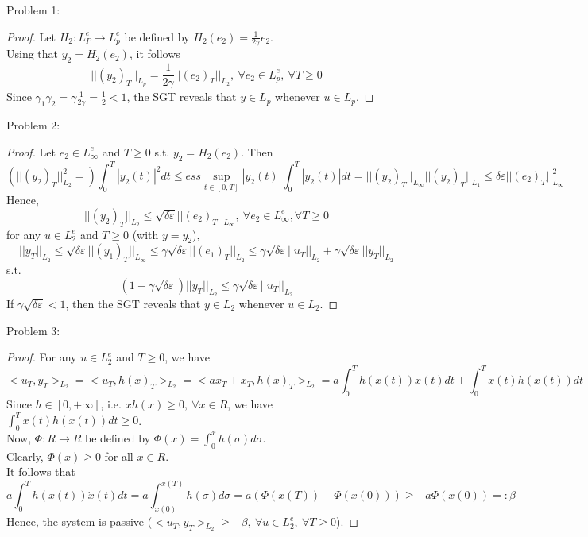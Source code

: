 Problem 1:
\begin{proof}
    Let $H_2:L^e_P \rightarrow L^e_p$ be defined by $H_2(e_2)=\frac{1}{2\gamma}e_2$. \\
    Using that $y_2=H_2(e_2)$, it follows
    $$||(y_2)_T||_{L_p}=\frac{1}{2\gamma}||(e_2)_T||_{L_2}, \ \forall e_2 \in L^e_p, \ \forall T \ge 0$$
    Since $\gamma_1 \gamma_2 = \gamma \frac{1}{2\gamma} = \frac{1}{2} < 1$, the SGT reveals that $y \in L_p$ whenever $u \in L_p$.
\end{proof}

Problem 2:
\begin{proof}
    Let $e_2 \in L^e_{\infty}$ and $T \ge 0$ s.t. $y_2=H_2(e_2)$. Then
    $$(||(y_2)_T||^2_{L_2}=) \int^T_0|y_2(t)|^2dt \le ess \sup_{t \in [0,T]} |y_2(t)| \int_0^T |y_2(t)|dt = ||(y_2)_T||_{L_\infty}||(y_2)_T||_{L_1} \le \delta \varepsilon ||(e_2)_T||^2_{L_\infty}$$
    Hence,
    $$||(y_2)_T||_{L_2} \le \sqrt{\delta \varepsilon}||(e_2)_T||_{L_{\infty}}, \ \forall e_2 \in L^e_{\infty}, \forall T \ge 0$$
    for any $u \in L^e_2$ and $T \ge 0$ (with $y=y_2$),
    $$||y_T||_{L_2} \le \sqrt{\delta \varepsilon}||(y_1)_T||_{L_{\infty}} \le \gamma \sqrt{\delta \varepsilon} ||(e_1)_T||_{L_2} \le \gamma \sqrt{\delta \varepsilon} ||u_T||_{L_2} + \gamma \sqrt{\delta \varepsilon} ||y_T||_{L_2}$$
    s.t.
    $$(1-\gamma \sqrt{\delta \varepsilon})||y_T||_{L_2} \le \gamma \sqrt{\delta \varepsilon} ||u_T||_{L_2}$$
    If $\gamma \sqrt{\delta \varepsilon} < 1$, then the SGT reveals that $y \in L_2$ whenever $u \in L_2$.
\end{proof}

Problem 3:
\begin{proof}
    For any $u \in L^e_2$ and $T \ge 0$, we have
    $$<u_T,y_T>_{L_2} = <u_T,h(x)_T>_{L_2} = <a \dot{x}_T+x_T,h(x)_T>_{L_2} = a \int_0^T h(x(t)) \dot{x}(t)dt + \int_0^T x(t)h(x(t))dt$$
    Since $h \in [0, +\infty]$, i.e. $xh(x) \ge 0, \ \forall x \in R$, we have $\int_0^Tx(t)h(x(t))dt \ge 0$.\\
    Now, $\Phi: R \rightarrow R$ be defined by $\Phi(x) = \int_0^x h(\sigma)d\sigma$. \\
    Clearly, $\Phi(x) \ge 0$ for all $x \in R$.\\
    It follows that
    $$a \int_0^Th(x(t)) \dot{x}(t) dt = a \int_{x(0)}^{x(T)}h(\sigma)d\sigma = a(\Phi(x(T))-\Phi(x(0))) \ge -a\Phi(x(0)) =: \beta$$
    Hence, the system is passive ($<u_T,y_T>_{L_2} \ge - \beta, \ \forall u \in L^e_2, \ \forall T \ge 0$).
\end{proof}

